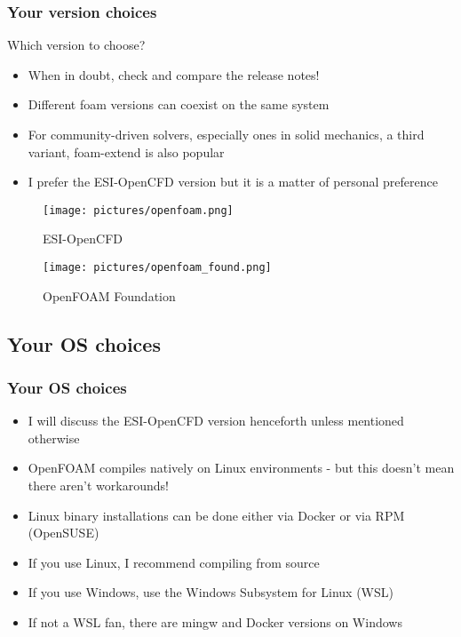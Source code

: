 \documentclass[notheorems, aspectratio=169]{beamer}
\begin{document}
\begin{frame}
  \frametitle{Your version choices}

  Which version to choose?


  \begin{itemize}
  \item When in doubt, check and compare the release notes!
  \item Different foam versions can coexist on the same system
  \item For community-driven solvers, especially ones in solid mechanics, a third variant, foam-extend is also popular
  \item I prefer the ESI-OpenCFD version but it is a matter of personal preference
  \end{itemize}



  \begin{figure}[!htb]
    \centering
    \begin{minipage}{.5\textwidth}
        \centering
        \texttt{[image: pictures/openfoam.png]}
        \caption{ESI-OpenCFD}
    \end{minipage}%
    \begin{minipage}{0.5\textwidth}
        \centering
        \texttt{[image: pictures/openfoam\_found.png]}
        \caption{OpenFOAM Foundation}
    \end{minipage}
\end{figure}
    
\end{frame}

\subsection{Your OS choices}
\begin{frame}
  \frametitle{Your OS choices}
  \begin{itemize}
  \item I will discuss the ESI-OpenCFD version henceforth unless mentioned otherwise
  \item OpenFOAM compiles natively on Linux environments - but this doesn't mean there aren't workarounds!
  \item Linux binary installations can be done either via Docker or via RPM (OpenSUSE)
  \item If you use Linux, I recommend compiling from source
  \item If you use Windows, use the Windows Subsystem for Linux (WSL)
  \item If not a WSL fan, there are mingw and Docker versions on Windows

\end{itemize}
\end{frame}
\end{document}

